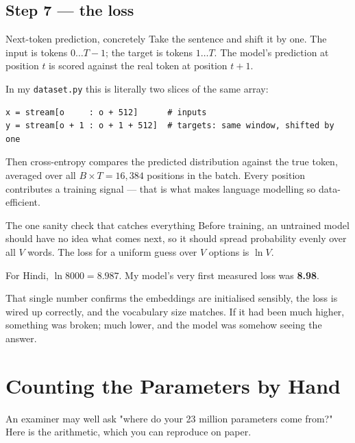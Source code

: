 \documentclass[11pt]{report}
\newcommand{\p}[1]{\texttt{#1}}
\begin{document}
\section{Step 7 --- the loss}

\begin{concept}{Next-token prediction, concretely}
Take the sentence and shift it by one. The input is tokens $0 \ldots T-1$; the
target is tokens $1 \ldots T$. The model's prediction at position $t$ is scored
against the real token at position $t{+}1$.

In my \p{dataset.py} this is literally two slices of the same array:
\begin{lstlisting}
x = stream[o     : o + 512]      # inputs
y = stream[o + 1 : o + 1 + 512]  # targets: same window, shifted by one
\end{lstlisting}

Then cross-entropy compares the predicted distribution against the true token,
averaged over all $B \times T = 16{,}384$ positions in the batch. Every position
contributes a training signal --- that is what makes language modelling so
data-efficient.
\end{concept}

\begin{example}{The one sanity check that catches everything}
Before training, an untrained model should have no idea what comes next, so it
should spread probability evenly over all $V$ words. The loss for a uniform guess
over $V$ options is $\ln V$.

For Hindi, $\ln 8000 = 8.987$. My model's very first measured loss was
\textbf{8.98}.

That single number confirms the embeddings are initialised sensibly, the loss is
wired up correctly, and the vocabulary size matches. If it had been much higher,
something was broken; much lower, and the model was somehow seeing the answer.
\end{example}

\chapter{Counting the Parameters by Hand}

An examiner may well ask "where do your 23 million parameters come from?" Here is
the arithmetic, which you can reproduce on paper.
\end{document}
